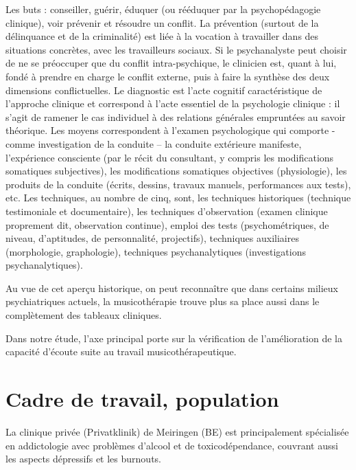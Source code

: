 Les buts : conseiller, guérir, éduquer (ou rééduquer par la psychopédagogie clinique), voir prévenir et résoudre un conflit. La prévention (surtout de la délinquance et de la criminalité) est liée à la vocation à travailler dans des situations concrètes, avec les travailleurs sociaux.
Si le psychanalyste peut choisir de ne se préoccuper que du conflit intra-psychique, le clinicien est, quant à lui, fondé à prendre en charge le conflit externe, puis à faire la synthèse des deux dimensions conflictuelles.
Le diagnostic est l’acte cognitif caractéristique de l’approche clinique et correspond à l’acte essentiel de la psychologie clinique : il s’agit de ramener le cas individuel à des relations générales empruntées au savoir théorique.
Les moyens correspondent à l’examen psychologique qui comporte - comme investigation de la conduite – la conduite extérieure manifeste, l’expérience consciente (par le récit du consultant, y compris les modifications somatiques subjectives), les modifications somatiques objectives (physiologie), les produits de la conduite (écrits, dessins, travaux manuels, performances aux tests), etc.
Les techniques, au nombre de cinq, sont, les techniques historiques (technique testimoniale et documentaire), les techniques d’observation (examen clinique proprement dit, observation continue), emploi des tests (psychométriques, de niveau, d’aptitudes, de personnalité, projectifs), techniques auxiliaires (morphologie, graphologie), techniques psychanalytiques (investigations psychanalytiques).

 







Au vue de cet aperçu historique, on peut reconnaître que
dans certains milieux psychiatriques actuels, la musicothérapie trouve
plus sa place aussi dans le complètement des tableaux cliniques.

Dans notre étude, l'axe principal porte sur la
vérification de l'amélioration de
la capacité d'écoute suite au travail musicothérapeutique.




\section{Cadre de travail, population}

 La clinique privée (Privatklinik)
de Meiringen (BE) est  principalement spécialisée en
addictologie avec problèmes d'alcool et de toxicodépendance, couvrant aussi les aspects dépressifs
et les
burnouts.


